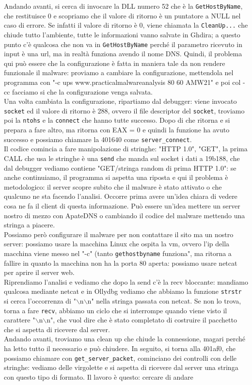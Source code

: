 \documentclass[12pt, oneside]{extbook}
\begin{document}
Andando avanti, si cerca di invocare la DLL numero 52 che è la \texttt{GetHostByName}, che restituisce 0 e scopriamo che il valore di ritorno è un puntatore a NULL nel caso di errore. Se infatti il valore di ritorno è 0, viene chiamata la \texttt{CleanUp...} che chiude tutto l'ambiente, tutte le informazioni vanno salvate in Ghdira; a questo punto c'è qualcosa che non va in \texttt{GetHostByName} perché il parametro ricevuto in input è una url, ma in realtà funziona avendo il nome DNS. Quindi, il problema qui può essere che la configurazione è fatta in maniera tale da non rendere funzionale il malware: proviamo a cambiare la configurazione, mettendola nel programma con "-c ups www.practicalmalwareanalysis 80 60 AMW21" e poi col -cc facciamo si che la configurazione venga salvata.\\ Una volta cambiata la configurazione, ripartiamo dal debugger: viene invocato \texttt{socket} ed il valore di ritorno è 288, ovvero il file descriptor del \texttt{socket}, troviamo poi la \texttt{ntohs} e la \texttt{connect} che hanno tutte successo. Dopo di che ritorna e si prepara a fare altro, ma ritorna con EAX = 0 e quindi la funzione ha avuto successo e possiamo chiamare la 401640 come \texttt{server\_connect}.\\Il codice comincia a fare manipolazione di stringhe: "HTTP 1.0", "GET", la prima CALL che usa le stringhe è una \texttt{send} che manda sul socket i dati a 19b188, che dal debugger vediamo contiene "GET/stringa random di prima HTTP 1.0": se anche continuiamo, il programma si aspetta una riposta e qui il problema è metodologico: il server scopre subito che il malware è stato attivato o che qualcuno ne sta facendo l'analisi. Occorre prima avere un'idea chiara di vedere cosa ne fa il client di questa informazione. Può essere un'idea mettere un server nostro di mezzo con ApateDNS o cambiando il codice del malware mettendo una stringa a piacere.\\Possiamo però configurare il malware per non contattare il sito ma un nostro server: possiamo usare la macchina Linux che ospita la vm, ovvero l'ip della macchina viene messo nel "-c" (tanto \texttt{gethostbyname} funziona", ma ritorna a fallire in quanto la macchina non ha la porta 80 aperta: possiamo usare netcat per aprire il server web.\\Riprendiamo l'analisi e vediamo che dopo la send c'è la recv bloccante: mandiamo qualcosa mediante netcat e in Ollydbg vediamo che abbiamo la funzione \texttt{strstr} si cerca l'occorrenza di "$\backslash$n$\backslash$n" nella stringa passata con netcat. Se non lo trova, torna a fare \texttt{recv}, abbiamo un ciclo che si interrompe quando viene visto il carattere "$\backslash$n$\backslash$n", che vuol dire che è stato completato di costruire il pacchetto che si aspetta di ricevere dal server.\\Andando avanti, troviamo una clean up che chiude la connessione, magari perché ha letto tutto il necessario e può chiudere. In seguito, si torna alla 401af0, che possiamo chiamare con \texttt{get\_server\_packet}, cominciano dei controlli con delle stringhe: vediamo delle virgolette e si aspetta di ricevere dal server una stringa con questo tipo di formato. Il lavoro è questo: cercare di andare 
\end{document}

